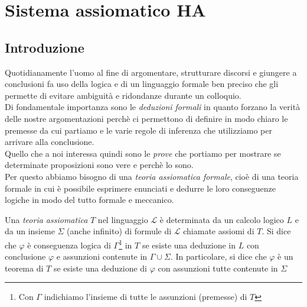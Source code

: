 \chapter{Sistema assiomatico HA}
\section{Introduzione}

Quotidianamente l'uomo al fine di argomentare, strutturare discorsi e giungere a conclusioni fa uso della logica e di un linguaggio formale ben preciso che gli permette di evitare ambiguit\`a e ridondanze durante un colloquio.\\
Di fondamentale importanza sono le \emph{deduzioni formali} in quanto forzano la verit\`a delle nostre argomentazioni perch\`e ci permettono di definire in modo chiaro le premesse da cui partiamo e le varie regole di inferenza che utilizziamo per arrivare alla conclusione.\\
Quello che a noi interessa quindi sono le \emph{prove} che portiamo per mostrare se determinate proposizioni sono vere e perch\`e lo sono.\\
Per questo abbiamo bisogno di una \emph{teoria assiomatica formale}, cio\`e di una teoria formale in cui \`e possibile esprimere enunciati e dedurre le loro conseguenze logiche in modo del tutto formale e meccanico.\\
\vspace{0.3 cm}

Una \emph{teoria assiomatica} $T$ nel linguaggio $\mathcal{L}$ \`e determinata da un calcolo logico $L$ e da un insieme $\Sigma$ (anche infinito) di formule di $\mathcal{L}$ chiamate assiomi di $T$. Si dice che $\varphi$ \`e conseguenza logica di $\Gamma$\footnote{Con $\Gamma$ indichiamo l'insieme di tutte le assunzioni (premesse) di $T$} in $T$ se esiste una deduzione in $L$ con conclusione $\varphi$ e assunzioni contenute in $\Gamma \cup \Sigma$. In particolare, si dice che $\varphi$ \`e un teorema di $T$ se esiste una deduzione di $\varphi$ con assunzioni tutte contenute in $\Sigma$


